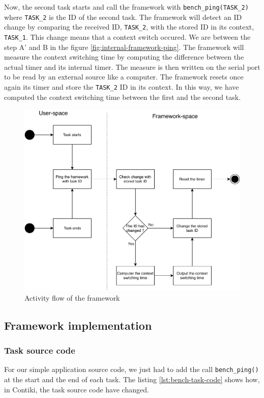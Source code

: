 Now, the second task starts and call the framework with \texttt{bench\_ping(TASK\_2)} where \texttt{TASK\_2} is the ID of the second task.
The framework will detect an ID change by comparing the received ID, \texttt{TASK\_2}, with the stored ID in its context, \texttt{TASK\_1}.
This change means that a context switch occured.
We are between the step A' and B in the figure \ref{fig:internal-framework-ping}.
The framework will measure the context switching time by computing the difference between the actual timer and its internal timer.
The measure is then written on the serial port to be read by an external source like a computer.
The framework resets once again its timer and store the \texttt{TASK\_2} ID in its context.
In this way, we have computed the context switching time between the first and the second task.

\begin{figure}[!ht]
  \centering
  \includegraphics[scale=0.7]{assets/extension-activity-framework.pdf}
  \caption{Activity flow of the framework\label{fig:extension-activity-framework}}
\end{figure}

\subsection{Framework implementation}

\subsubsection{Task source code}
For our simple application source code, we just had to add the call \texttt{bench\_ping()} at the start and the end of each task.
The listing \ref{lst:bench-task-code} shows how, in Contiki, the task source code have changed.

